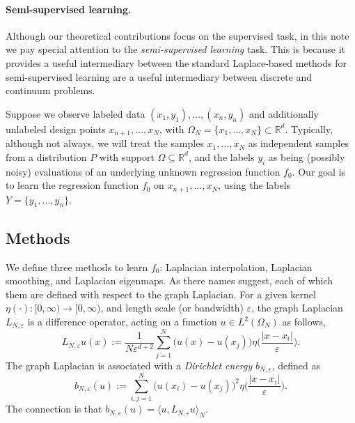 \documentclass{article}
\newcommand{\Reals}{\mathbb{R}}
\newcommand{\1}{\mathbf{1}}
\newcommand{\Rd}{\Reals^d}
\newcommand{\dotp}[2]{\langle #1, #2 \rangle}
\theoremstyle{definition}
\theoremstyle{remark}
\begin{document}
\paragraph{Semi-supervised learning.}
Although our theoretical contributions focus on the supervised task, in this note we pay special attention to the \emph{semi-supervised learning} task. This is because it provides a useful intermediary between the standard Laplace-based methods for semi-supervised learning are a useful intermediary between discrete and continuum problems. 

Suppose we observe labeled data $(x_1,y_1),\ldots,(x_n,y_n)$ and additionally unlabeled design points $x_{n + 1},\ldots,x_{N}$, with $\Omega_N = \{x_1,\ldots,x_N\} \subset \Rd$. Typically, although not always, we will treat the samples $x_1,\ldots,x_N$ as independent samples from a distribution $P$ with support $\Omega \subseteq \Rd$, and the labels $y_i$ as being (possibly noisy) evaluations of an underlying unknown regression function $f_0$. Our goal is to learn the regression function $f_0$ on $x_{n + 1},\ldots,x_{N}$, using the labels $Y = \{y_1,\ldots,y_n\}$.

\subsection{Methods}
We define three methods to learn $f_0$: Laplacian interpolation, Laplacian smoothing, and Laplacian eigenmaps. As there names suggest, each of which them are defined with respect to the graph Laplacian. For a given kernel $\eta(\cdot): [0,\infty) \to [0,\infty)$, and length scale (or bandwidth) $\varepsilon$, the graph Laplacian $L_{N,\varepsilon}$ is a difference operator, acting on a function $u \in L^2(\Omega_N)$ as follows, 
\begin{equation*}
L_{N,\varepsilon}u(x) := \frac{1}{N\varepsilon^{d + 2}}\sum_{j = 1}^{N} \bigl(u(x) - u(x_j)\bigr)\eta\biggl(\frac{|x - x_i|}{\varepsilon}\biggr).
\end{equation*}
The graph Laplacian is associated with a \emph{Dirichlet energy} $b_{N,\varepsilon}$, defined as 
\begin{equation*}
b_{N,\varepsilon}(u) := \sum_{i,j = 1}^{N} \bigl(u(x_i) - u(x_j)\bigr)^2 \eta\biggl(\frac{|x - x_i|}{\varepsilon}\biggr).
\end{equation*}
The connection is that $b_{N,\varepsilon}(u) = \dotp{u}{L_{N,\varepsilon}u}_{N}$.
\end{document}
